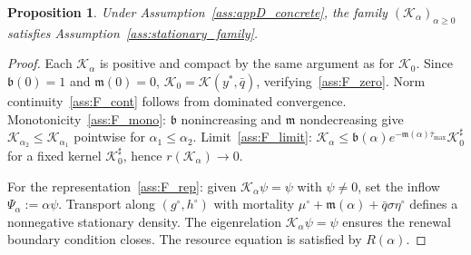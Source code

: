 \documentclass[pdflatex,sn-mathphys-num]{sn-jnl}%
\newtheorem{proposition}[theorem]{Proposition}
\begin{document}
\begin{proposition}\label{prop:appD_verify}
Under Assumption~\ref{ass:appD_concrete}, the family
\((\mathcal K_\alpha)_{\alpha\ge 0}\) satisfies Assumption~\ref{ass:stationary_family}.
\end{proposition}
\begin{proof}
Each \(\mathcal K_\alpha\) is positive and compact by the same argument as for
\(\mathcal K_0\). Since \(\mathfrak b(0)=1\) and \(\mathfrak m(0)=0\),
\(\mathcal K_0=\mathcal K(y^\ast,\bar q)\), verifying~\ref{ass:F_zero}.
Norm continuity~\ref{ass:F_cont} follows from dominated convergence.
Monotonicity~\ref{ass:F_mono}: \(\mathfrak b\) nonincreasing and
\(\mathfrak m\) nondecreasing give
\(\mathscr K_{\alpha_2}\le\mathscr K_{\alpha_1}\) pointwise for
\(\alpha_1\le\alpha_2\).
Limit~\ref{ass:F_limit}: \(\mathscr K_\alpha\le
\mathfrak b(\alpha)e^{-\mathfrak m(\alpha)\overline\tau_{\max}}\mathscr K_0^\sharp\)
for a fixed kernel \(\mathscr K_0^\sharp\), hence
\(r(\mathcal K_\alpha)\to 0\).

For the representation~\ref{ass:F_rep}: given
\(\mathcal K_\alpha\psi=\psi\) with \(\psi\neq 0\),
set the inflow \(\Psi_\alpha:=\alpha\psi\). Transport along
\((g^\circ,h^\circ)\) with mortality
\(\mu^\circ+\mathfrak m(\alpha)+\bar q\sigma\eta^\circ\) defines a nonnegative
stationary density. The eigenrelation
\(\mathcal K_\alpha\psi=\psi\) ensures the renewal boundary condition closes.
The resource equation is satisfied by \(R(\alpha)\).


\end{proof}
\end{document}
